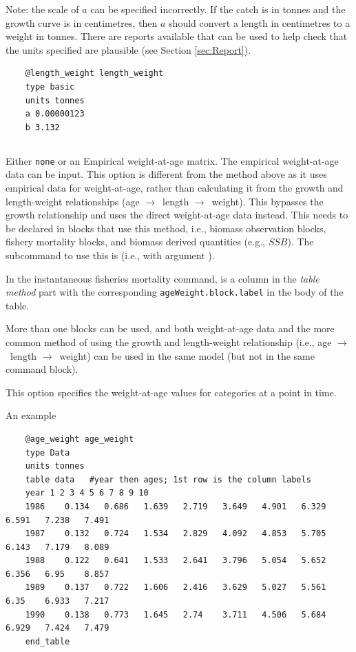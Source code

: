 Note: the scale of $a$ can be specified incorrectly. If the catch is in tonnes and the growth curve is in centimetres, then $a$ should convert a length in centimetres to a weight in tonnes. There are reports available that can be used to help check that the units specified are plausible (see Section \ref{sec:Report}).
{\small{\begin{verbatim}
	@length_weight length_weight
	type basic
	units tonnes
	a 0.00000123
	b 3.132
\end{verbatim}}}

\ifAgeBased
\subsection{}\label{sec:AgeWeight} 

Either \texttt{none}\label{sec:AgeWeight-None} or an Empirical weight-at-age matrix. The empirical weight-at-age data can be input\label{sec:AgeWeight-Data}. This option is different from the method above as it uses empirical data for weight-at-age, rather than calculating it from the growth and length-weight relationships (age $\rightarrow$\ length $\rightarrow$\ weight). This bypasses the growth relationship and uses the direct weight-at-age data instead. This needs to be declared in blocks that use this method, i.e., biomass observation blocks, fishery mortality blocks, and biomass derived quantities (e.g., $SSB$). The subcommand to use this is  (i.e., with argument  ). 

In the instantaneous fisheries mortality command,  is a column in the \textit{table method} part with the corresponding \texttt{ageWeight.block.label} in the body of the table. 

More than one  blocks can be used, and both weight-at-age data and the more common method of using the growth and length-weight relationship (i.e., age $\rightarrow$\ length $\rightarrow$\ weight) can be used in the same model (but not in the same command block).

This option specifies the weight-at-age values for categories at a point in time.

An example

{\small{\begin{verbatim}
	@age_weight age_weight
	type Data
	units tonnes
	table data   #year then ages; 1st row is the column labels
	year 1 2 3 4 5 6 7 8 9 10
	1986	0.134	0.686	1.639	2.719	3.649	4.901	6.329	6.591	7.238	7.491
	1987	0.132	0.724	1.534	2.829	4.092	4.853	5.705	6.143	7.179	8.089
	1988	0.122	0.641	1.533	2.641	3.796	5.054	5.652	6.356	6.95	8.857
	1989	0.137	0.722	1.606	2.416	3.629	5.027	5.561	6.35	6.933	7.217
	1990	0.138	0.773	1.645	2.74	3.711	4.506	5.684	6.929	7.424	7.479
	end_table
\end{verbatim}}}

